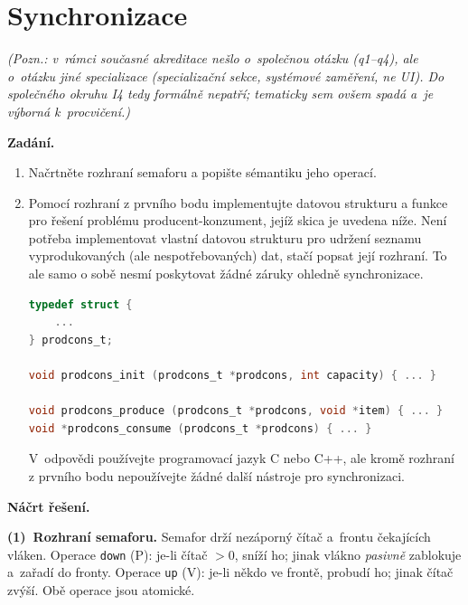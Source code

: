 \section{Synchronizace}
\noindent\textit{(Pozn.: v~rámci současné akreditace nešlo o~společnou otázku (q1--q4), ale o~otázku jiné specializace (specializační sekce, systémové zaměření, ne UI). Do společného okruhu I4 tedy formálně nepatří; tematicky sem ovšem spadá a~je výborná k~procvičení.)}\par

\noindent\textbf{Zadání.}\par
\begin{enumerate}
\item Načrtněte rozhraní semaforu a popište sémantiku jeho operací.
\item Pomocí rozhraní z prvního bodu implementujte datovou strukturu a funkce pro řešení
  problému producent-konzument, jejíž skica je uvedena níže. Není potřeba implementovat
  vlastní datovou strukturu pro udržení seznamu vyprodukovaných (ale nespotřebovaných) dat,
  stačí popsat její rozhraní. To ale samo o sobě nesmí poskytovat žádné záruky ohledně
  synchronizace.

\begin{lstlisting}[language=C]
typedef struct {
    ...
} prodcons_t;

void prodcons_init (prodcons_t *prodcons, int capacity) { ... }

void prodcons_produce (prodcons_t *prodcons, void *item) { ... }
void *prodcons_consume (prodcons_t *prodcons) { ... }
\end{lstlisting}

V~odpovědi používejte programovací jazyk C nebo C++, ale kromě rozhraní z prvního bodu
nepoužívejte žádné další nástroje pro synchronizaci.
\end{enumerate}

\medskip
\noindent\textbf{Náčrt řešení.}\par
\textbf{(1)~Rozhraní semaforu.} Semafor drží nezáporný čítač a~frontu čekajících vláken.
Operace \texttt{down} (P): je-li čítač $>0$, sníží ho; jinak vlákno \emph{pasivně} zablokuje
a~zařadí do fronty. Operace \texttt{up} (V): je-li někdo ve frontě, probudí ho; jinak čítač
zvýší. Obě operace jsou atomické.

